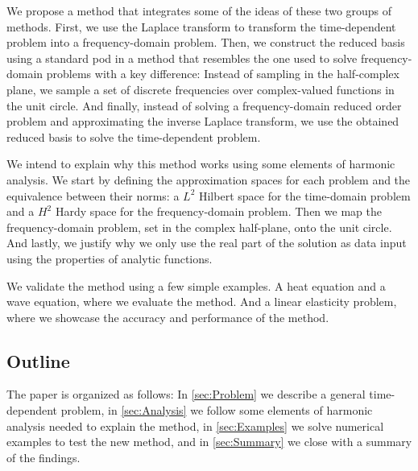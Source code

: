 We propose a method that integrates some of the ideas of these two groups of methods. First, we use the Laplace transform to transform the time-dependent problem into a frequency-domain problem. Then, we construct the reduced basis using a standard  \gls{pod} in a method that resembles the one used to solve frequency-domain problems \cite{huynh_laplace_2011,peng_symplectic_2015} with a key difference: Instead of sampling in the half-complex plane, we sample a set of discrete frequencies over complex-valued functions in the unit circle. And finally, instead of solving a frequency-domain reduced order problem and approximating the inverse Laplace transform, we use the obtained reduced basis to solve the time-dependent problem.

We intend to explain why this method works using some elements of harmonic analysis. We start by defining the approximation spaces for each problem and the equivalence between their norms: a $L^2$ Hilbert space for the time-domain problem and a $H^2$ Hardy space for the frequency-domain problem. Then we map the frequency-domain problem, set in the complex half-plane, onto the unit circle. And lastly, we justify why we only use the real part of the solution as data input using the properties of analytic functions. 

We validate the method using a few simple examples. A heat equation and a wave equation, where we evaluate the method. And a linear elasticity problem, where we showcase the accuracy and performance of the method. 

\subsection*{Outline}
The paper is organized as follows: In \cref{sec:Problem} we describe a general time-dependent problem, in \cref{sec:Analysis} we follow some elements of harmonic analysis needed to explain the method, in \cref{sec:Examples} we solve numerical examples to test the new method, and in \cref{sec:Summary} we close with a summary of the findings.